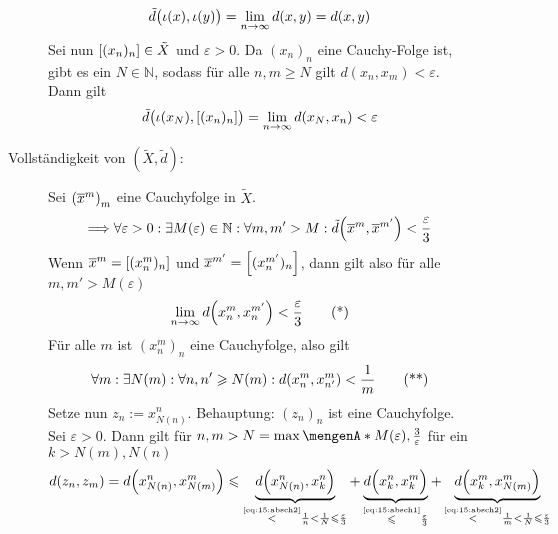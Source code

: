 \begin{description}
\begin{description}
	\[
		\tilde{d} \enbrace[\big]{\iota(x),\iota(y)} = \lim_{ n \to \infty} d(x,y) = d(x,y)
	\]
	Sei nun $\benbrace*{(x_n)_n} \in \tilde{X}$ und $\varepsilon>0$. Da $(x_n)_n$ eine Cauchy-Folge ist, gibt es ein $N \in \mathds{N}$, sodass für alle
	$n,m \ge N$ gilt $d(x_n,x_m) <\varepsilon$. Dann gilt
	\[
		\tilde{d}\enbrace[\big]{\iota(x_N), \benbrace*{(x_n)_n} } = \lim_{ n \to \infty} d \enbrace*{x_N, x_n} < \varepsilon
	\]
	\item[Vollständigkeit von $(\tilde{X}, \tilde{d})$:] Sei $\enbrace*{\overline{x}^m}_m$ eine Cauchyfolge in $\tilde{X}$.
	\[
		\Longrightarrow \forall \varepsilon >0 : \exists M(\varepsilon) \in \mathds{N} : \forall m,m' > M : \tilde{d} \enbrace*{\overline{x}^m, \overline{x}^{m'}} < \frac{\varepsilon}{3} 
	\]
	Wenn $\overline{x}^m = \benbrace*{(x^m_n)_n}$ und $\overline{x}^{m'} = \benbrace*{(x^{m'}_n)_n} $, dann gilt also für alle $m,m' >M(\varepsilon)$
	\begin{equation*}
		\lim_{ n \to \infty} d \enbrace*{x^m_n, x^{m'}_n} < \frac{\varepsilon}{3}  \label{eq:15:absch1}\tag{*}
	\end{equation*}
	Für alle $m$ ist $(x^m_n)_n$ eine Cauchyfolge, also gilt
	\begin{equation*}
		\forall m : \exists N(m) : \forall n,n' \ge N(m) : d \enbrace*{x^m_n, x^m_{n'}} < \frac{1}{m}  \label{eq:15:absch2}\tag{**}
	\end{equation*}
	Setze nun $z_n := x^n_{N(n)}$. Behauptung: $(z_n)_n$ ist eine Cauchyfolge. Sei $\varepsilon>0$. Dann gilt für $n,m>N=\max\set{M(\varepsilon), \frac{3}{\varepsilon}}$
	für ein $k > N(m), N(n)$ 
	\begin{align*}
		d(z_n,z_m) = d \enbrace*{x^n_{N(n)}, x^m_{N(m)}} \le 
		\underbrace{d\enbrace*{x^n_{N(n)}, x^n_k}}_{\stackrel{\mbox{\tiny\eqref{eq:15:absch2}}}{<} \frac{1}{n} < \frac{1}{N} \le \frac{\varepsilon}{3}} + 
		\underbrace{d\enbrace[\Big]{x^n_k, x^m_k}}_{\stackrel{\mbox{\tiny\eqref{eq:15:absch1}}}{\le} \frac{\varepsilon}{3}}   + 
		\underbrace{d\enbrace*{x^m_k, x^m_{N(m)}}}_{\stackrel{\mbox{\tiny\eqref{eq:15:absch2}}}{<} \frac{1}{m} < \frac{1}{N} \le \frac{\varepsilon}{3}} 

\end{align*}
\end{description}
\end{description}
